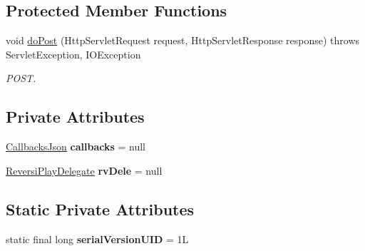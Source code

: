 \subsection*{Protected Member Functions}
\begin{DoxyCompactItemize}
\item 
void \hyperlink{classjp_1_1gr_1_1java__conf_1_1yuta__yoshinaga_1_1reversi_1_1controller_1_1_front_controller_a2f0d63da6e6fc17d2ecf2695af6f8d99}{do\+Post} (Http\+Servlet\+Request request, Http\+Servlet\+Response response)  throws Servlet\+Exception, I\+O\+Exception 
\begin{DoxyCompactList}\small\item\em P\+O\+ST. \end{DoxyCompactList}\end{DoxyCompactItemize}
\subsection*{Private Attributes}
\begin{DoxyCompactItemize}
\item 
\mbox{\label{classjp_1_1gr_1_1java__conf_1_1yuta__yoshinaga_1_1reversi_1_1controller_1_1_front_controller_aba15286819435469622375192358dee7}} 
\hyperlink{classjp_1_1gr_1_1java__conf_1_1yuta__yoshinaga_1_1reversi_1_1model_1_1_callbacks_json}{Callbacks\+Json} {\bfseries callbacks} = null
\item 
\mbox{\label{classjp_1_1gr_1_1java__conf_1_1yuta__yoshinaga_1_1reversi_1_1controller_1_1_front_controller_a582bcd1cbb69aaf686182d85dbd21f2d}} 
\hyperlink{classjp_1_1gr_1_1java__conf_1_1yuta__yoshinaga_1_1reversi_1_1model_1_1_reversi_play_delegate}{Reversi\+Play\+Delegate} {\bfseries rv\+Dele} = null
\end{DoxyCompactItemize}
\subsection*{Static Private Attributes}
\begin{DoxyCompactItemize}
\item 
\mbox{\label{classjp_1_1gr_1_1java__conf_1_1yuta__yoshinaga_1_1reversi_1_1controller_1_1_front_controller_a42e40239dd4f246bd1524cdb08ca41af}} 
static final long {\bfseries serial\+Version\+U\+ID} = 1L
\end{DoxyCompactItemize}


